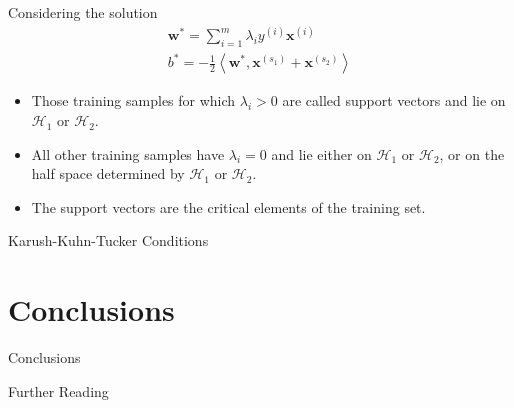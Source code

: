 \documentclass{beamer}
\begin{document}
\begin{frame}
    Considering the solution~\cite{Gunn1998}
    $$
    \begin{array}{l}
        \mathbf{w}^* = \sum\limits^m_{i=1} \lambda_i y^{(i)}
        \mathbf{x}^{(i)} \\[.4cm]
        b^* = - \frac{1}{2} \left< \mathbf{w}^*, \mathbf{x}^{(s_1)} + \mathbf{x}^{(s_2)}
        \right>
    \end{array}
    $$

    \begin{itemize} 
        \item Those training samples for which $\lambda_i > 0$ are called \alert{support
            vectors} and lie on $\mathcal{H}_1$ or $\mathcal{H}_2$.
        \item All other training samples have $\lambda_i = 0$ and lie either on
            $\mathcal{H}_1$ or $\mathcal{H}_2$, or on the half space determined by
            $\mathcal{H}_1$ or $\mathcal{H}_2$.
        \item The support vectors are the \alert{critical elements} of the training set.
    \end{itemize} 
    
\end{frame}


\begin{frame}{Karush-Kuhn-Tucker Conditions}
    
\end{frame}


\section{Conclusions}

\begin{frame}{Conclusions}
    
\end{frame}




\begin{frame}{Further Reading}
    
    
\end{frame}
\end{document}
